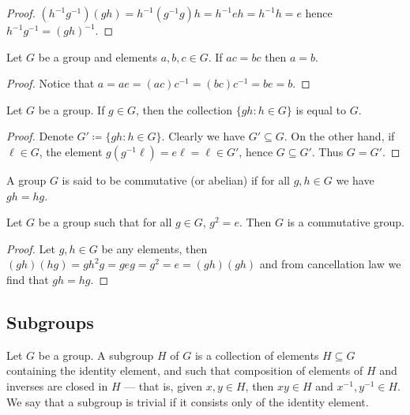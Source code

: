 \begin{proof}
\((h^{-1} g^{-1})(g h) = h^{-1} (g^{-1} g) h = h^{-1} e h = h^{-1} h = e\)
hence \(h^{-1} g^{-1} = (g h)^{-1}\).
\end{proof}

\begin{proposition}[Cancellation]
Let \(G\) be a group and elements \(a, b, c \in G\). If \(a c = b c\) then
\(a = b\).
\end{proposition}

\begin{proof}
Notice that \(a = a e = (a c) c^{-1} = (b c) c^{-1} = b e = b\).
\end{proof}

\begin{proposition}
Let \(G\) be a group. If \(g \in G\), then the collection \(\{g h \colon h \in G\}\)
is equal to \(G\).
\end{proposition}

\begin{proof}
Denote \(G' \coloneq \{g h \colon h \in G\}\). Clearly we have \(G' \subseteq G\). On the
other hand, if \(\ell \in G\), the element \(g (g^{-1} \ell) = e \ell = \ell
\in G'\), hence \(G \subseteq G'\). Thus \(G = G'\).
\end{proof}

\begin{definition}
A group \(G\) is said to be commutative (or abelian) if for all \(g, h \in G\)
we have \(g h = h g\).
\end{definition}

\begin{corollary}
Let \(G\) be a group such that for all \(g \in G\), \(g^2 = e\). Then \(G\) is
a commutative group.
\end{corollary}

\begin{proof}
Let \(g, h \in G\) be any elements, then \((g h) (h g) = g h^2 g = g e g = g^2
= e = (g h) (g h)\) and from cancellation law we find that \(g h = h g\).
\end{proof}

\subsection{Subgroups}

\begin{definition}[Subgroup]
\label{def:subgroup}
Let \(G\) be a group. A subgroup \(H\) of \(G\) is a collection of elements \(H
\subseteq G\) containing the identity element, and such that composition of
elements of \(H\) and inverses are closed in \(H\) --- that is, given \(x, y \in
H\), then \(xy \in H\) and \(x^{-1}, y^{-1} \in H\). We say that a subgroup is
trivial if it consists only of the identity element.
\end{definition}

